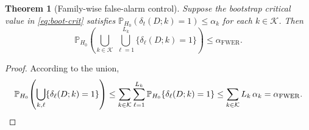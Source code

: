 \documentclass[10pt,a4paper]{amsart}
\newtheorem{theorem}{Theorem}
\newcommand{\Prob}{\mathbb{P}}
\begin{document}
\begin{theorem}[Family-wise false-alarm control]
\label{thm:fwer}
Suppose the bootstrap critical value in \eqref{eq:boot-crit} satisfies
$\Prob_{H_{0}}(\delta_{t}(D;k)=1)\leq\alpha_{k}$ for each $k\in\mathcal{K}$.
Then
\[
\Prob_{H_{0}}\!\left(
\bigcup_{k\in\mathcal{K}}\,\bigcup_{\ell=1}^{L_{k}}\{\delta_{\ell}(D;k)=1\}
\right) \leq \alpha_{\mathrm{FWER}}.
\]
\end{theorem}

\begin{proof}
According to the union,
\[
\Prob_{H_{0}}\!\left(\bigcup_{k,\ell}\{\delta_{\ell}(D;k)=1\}\right)
\leq
\sum_{k\in\mathcal{K}}\sum_{\ell=1}^{L_{k}}
\Prob_{H_{0}}\{\delta_{\ell}(D;k)=1\}
\leq
\sum_{k\in\mathcal{K}} L_{k}\,\alpha_{k}
= \alpha_{\mathrm{FWER}}.
\qedhere
\]
\end{proof}
\end{document}
